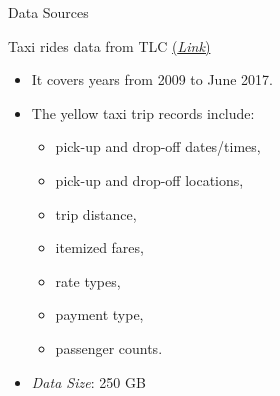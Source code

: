 \documentclass[10pt,ignorenonframetext,]{beamer}
\providecommand{\tightlist}{%
  \setlength{\itemsep}{0pt}\setlength{\parskip}{0pt}}
\begin{document}
\begin{frame}{%
\protect\hypertarget{data-sources}{%
Data Sources}}

\begin{block}{Taxi rides data from TLC
\href{http://www.nyc.gov/html/tlc/html/about/trip_record_data.shtml}{(\emph{Link})}}

\begin{itemize}
\item
  It covers years from 2009 to June 2017.
\item
  The yellow taxi trip records include:

  \begin{itemize}
  \tightlist
  \item
    pick-up and drop-off dates/times,
  \item
    pick-up and drop-off locations,
  \item
    trip distance,
  \item
    itemized fares,
  \item
    rate types,
  \item
    payment type,
  \item
    passenger counts.
  \end{itemize}
\item
  \emph{Data Size}: 250 GB
\end{itemize}

\end{block}

\end{frame}
\end{document}
